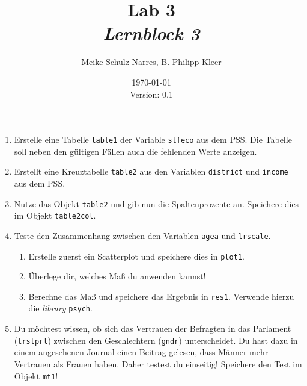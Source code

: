 \documentclass[12pt,a4paper]{article}
\title{Lab 3 \\ \normalsize \textit{Lernblock 3}}
\author{Meike Schulz-Narres, B. Philipp Kleer}
\date{\today \\ \small{Version: 0.1}}
\begin{document}
\maketitle

\begin{enumerate}
	\item Erstelle eine Tabelle \texttt{table1} der Variable \texttt{stfeco} aus dem PSS. Die Tabelle soll neben den gültigen Fällen auch die fehlenden Werte anzeigen.
	\item Erstellt eine Kreuztabelle \texttt{table2} aus den Variablen \texttt{district} und \texttt{income} aus dem PSS.
	\item Nutze das Objekt \texttt{table2} und gib nun die Spaltenprozente an. Speichere dies im Objekt \texttt{table2col}.
	\item Teste den Zusammenhang zwischen den Variablen \texttt{agea} und \texttt{lrscale}. 
	\begin{enumerate}
		\item Erstelle zuerst ein Scatterplot und speichere dies in \texttt{plot1}. 
		\item Überlege dir, welches Maß du anwenden kannst!
		\item Berechne das Maß und speichere das Ergebnis in \texttt{res1}. Verwende hierzu die \textit{library} \texttt{psych}.
	\end{enumerate}
	\item Du möchtest wissen, ob sich das Vertrauen der Befragten in das Parlament (\texttt{trstprl}) zwischen den Geschlechtern (\texttt{gndr}) unterscheidet. Du hast dazu in einem angesehenen Journal einen Beitrag gelesen, dass Männer mehr Vertrauen als Frauen haben. Daher testest du einseitig! Speichere den Test im Objekt \texttt{mt1}!
\end{enumerate}
\end{document}
